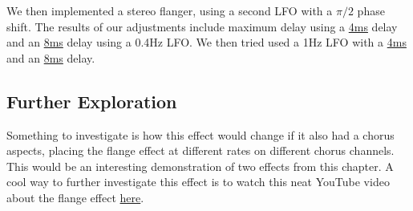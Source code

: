 We then implemented a stereo flanger, using a second LFO with a $\pi /2$ phase shift. The results of our adjustments include maximum delay using a
\href{run:../OutputAudio/stereoflange_22-004 Original Guitar_{freq=0.4Hz}{delay_max=4ms}.wav}{4ms}
delay and an
\href{run:../OutputAudio/stereoflange_22-004 Original Guitar_{freq=0.4Hz}{delay_max=8ms}.wav}{8ms}
 delay using a 0.4Hz LFO. We then tried used a 1Hz LFO with a
\href{run:../OutputAudio/stereoflange_22-004 Original Guitar_{freq=1Hz}{delay_max=4ms}.wav}{4ms}
and an
\href{run:../OutputAudio/stereoflange_22-004 Original Guitar_{freq=1Hz}{delay_max=8ms}.wav}{8ms}
delay.

\subsection{Further Exploration}
Something to investigate is how this effect would change if it also had a chorus aspects, placing the flange effect at different rates on different chorus channels. This would be an interesting demonstration of two effects from this chapter. A cool way to further investigate this effect is to watch this neat YouTube video about the flange effect \href{https://www.youtube.com/watch?v=Ici_YOVDl_0}{here}.
